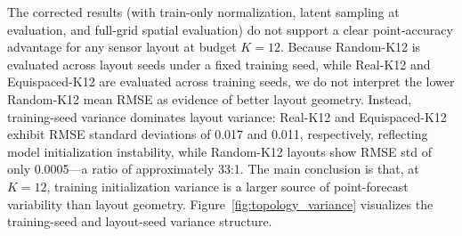 \documentclass[11pt,a4paper]{article}
\begin{document}
\begin{table}[!htbp]
\centering
\caption{Effect of sensor geometry under fixed budget $K{=}12$ (7-seed protocol). Real-K12 and Equispaced-K12 report mean$\pm$std across 7 training seeds; Random-K12 reports mean$\pm$std across 5 layout seeds with fixed training seed. These variances are therefore not directly interchangeable: the former measures training instability, the latter layout-induced variability. Note: the 7-seed pool here differs from the 3-seed subset used in Table~\ref{tab:missing_sensor}; numeric differences between the two tables (e.g., Corr$_S$ for Real-K12: 0.53 vs.\ 0.45) reflect different checkpoint populations rather than inconsistencies.}
\label{tab:real_geometry_osse}
\vspace{4pt}
\end{table}

The corrected results (with train-only normalization, latent sampling at evaluation, and full-grid spatial evaluation) do not support a clear point-accuracy advantage for any sensor layout at budget $K{=}12$. Because Random-K12 is evaluated across layout seeds under a fixed training seed, while Real-K12 and Equispaced-K12 are evaluated across training seeds, we do not interpret the lower Random-K12 mean RMSE as evidence of better layout geometry. Instead, training-seed variance dominates layout variance: Real-K12 and Equispaced-K12 exhibit RMSE standard deviations of 0.017 and 0.011, respectively, reflecting model initialization instability, while Random-K12 layouts show RMSE std of only 0.0005---a ratio of approximately 33:1. The main conclusion is that, at $K{=}12$, training initialization variance is a larger source of point-forecast variability than layout geometry. Figure~\ref{fig:topology_variance} visualizes the training-seed and layout-seed variance structure.
\end{document}
